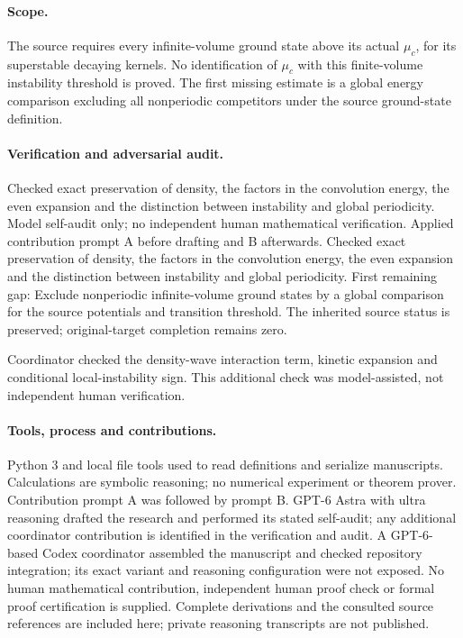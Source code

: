 \documentclass[11pt]{article}
\begin{document}
\paragraph{Scope.} The source requires every infinite-volume ground state above its actual \(\mu_c\), for its superstable decaying kernels. No identification of \(\mu_c\) with this finite-volume instability threshold is proved. The first missing estimate is a global energy comparison excluding all nonperiodic competitors under the source ground-state definition.

\paragraph{Verification and adversarial audit.}
Checked exact preservation of density, the factors in the convolution energy, the even expansion and the distinction between instability and global periodicity. Model self-audit only; no independent human mathematical verification. Applied contribution prompt A before drafting and B afterwards. Checked exact preservation of density, the factors in the convolution energy, the even expansion and the distinction between instability and global periodicity. First remaining gap: Exclude nonperiodic infinite-volume ground states by a global comparison for the source potentials and transition threshold. The inherited source status is preserved; original-target completion remains zero.

Coordinator checked the density-wave interaction term, kinetic expansion and conditional local-instability sign. This additional check was model-assisted, not independent human verification.

\paragraph{Tools, process and contributions.}
Python 3 and local file tools used to read definitions and serialize manuscripts. Calculations are symbolic reasoning; no numerical experiment or theorem prover. Contribution prompt A was followed by prompt B. GPT-6 Astra with ultra reasoning drafted the research and performed its stated self-audit; any additional coordinator contribution is identified in the verification and audit. A GPT-6-based Codex coordinator assembled the manuscript and checked repository integration; its exact variant and reasoning configuration were not exposed. No human mathematical contribution, independent human proof check or formal proof certification is supplied. Complete derivations and the consulted source references are included here; private reasoning transcripts are not published.
\end{document}
